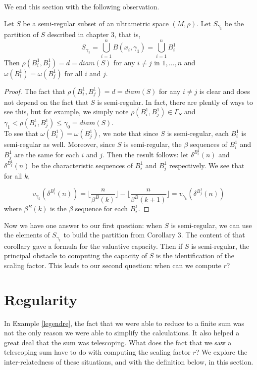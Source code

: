 We end this section with the following observation.

\begin{proposition}
	Let $S$ be a semi-regular subset of an ultrametric space $(M,\rho)$. Let $S_{\gamma_1}$ be the partition of $S$ described in chapter $3$, that is,
	\[S_{\gamma_1} = \bigcup_{i=1}^{n} B(x_i,\gamma_1) = \bigcup_{i=1}^{n} B^1_i\]
	Then $\rho(B^1_i, B^1_j) = d = diam(S)$ for any $i \neq j$ in $1,\ldots,n$ and $\omega( B^1_i) = \omega( B^1_j)$ for all $i$ and $j$.
\end{proposition}

\begin{proof}
	The fact that  $\rho(B^1_i, B^1_j) = d = diam(S)$ for any $i \neq j$ is clear and does not depend on the fact that $S$ is semi-regular. In fact, there are plently of ways to see this, but for example, we simply note $\rho(B^1_i, B^1_j) \in \Gamma_S$  and $ \gamma_1 < \rho(B^1_i, B^1_j)\leq \gamma_0 = diam(S)$.\\
	
	To see that $\omega( B^1_i) = \omega( B^1_j)$, we note that since $S$ is semi-regular, each $B^1_i$ is semi-regular as well. Moreover, since $S$ is semi-regular, the $\beta$ sequences of $B^1_i$ and $B^1_j$ are the same for each $i$ and $j$. Then the result follows: let $\delta^{B^1_i}(n)$ and $\delta^{B^1_j}(n)$ be the characteristic sequences of $B^1_i$ and $B^1_j$ respectively. We see that for all $k$,
	  
	  \[v_{\gamma_k}(\delta^{B^1_i}(n)) =  \lfloor\frac{n}{\beta^B(k)}\rfloor - \lfloor\frac{n}{\beta^B(k+1)}\rfloor =  v_{\gamma_k}(\delta^{B^1_j}(n)) \]
	where $\beta^B(k)$ is the $\beta$ sequence for each  $B^1_i$.
	 
\end{proof}

Now we have one answer to our first question: when $S$ is semi-regular, we can use the elements of $S_{\gamma_1}$ to build the partition from Corollary 3. The content of that corollary gave a formula for the valuative capacity. Then if $S$ is semi-regular, the principal obstacle to computing the capacity of $S$ is the identification of the scaling factor. This leads to our second question: when can we compute $r$?

\section{Regularity}
In Example \ref{legendre}, the fact that we were able to reduce to a finite sum was not the only reason we were able to simplify the calculations. It also helped a great deal that the sum was telescoping. What does the fact that we saw a telescoping sum have to do with computing the scaling factor $r$? We explore the inter-relatedness of these situations, and with the definition below, in this section.


